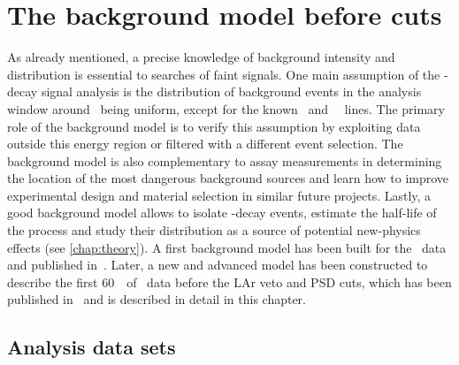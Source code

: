 
\chapter{The background model before cuts}\label{chap:bkg:raw:ph2}

As already mentioned, a precise knowledge of background intensity and distribution is
essential to searches of faint signals. One main assumption of the \onbb-decay signal
analysis is the distribution of background events in the analysis window around \qbb\
being uniform, except for the known \Tl\ and \Bil\ \g\ lines. The primary role of the
background model is to verify this assumption by exploiting data outside this energy
region or filtered with a different event selection. The background model is also
complementary to assay measurements in determining the location of the most dangerous
background sources and learn how to improve experimental design and material selection in
similar future projects. Lastly, a good background model allows to isolate \nnbb-decay
events, estimate the half-life of the process and study their distribution as a source of
potential new-physics effects (see \cref{chap:theory}).
\newpar
A first background model has been built for the \phaseone\ data and published
in~\cite{Agostini2013a}. Later, a new and advanced model has been constructed to describe
the first 60~\kgyr\ of \phasetwo\ data before the LAr veto and PSD cuts, which has been
published in~\cite{Agostini2019b} and is described in detail in this chapter.

\section{Analysis data sets}%
\label{sec:bkg:raw:data}

\begin{table}[b]
  \small
  \centering
  \caption{%
    Properties of the data sets considered in this analysis. Further
    details about the \gerda\ detectors can be found in past
    publications~\cite{Agostini2013a, Agostini2018a}.
  }\label{tab:bkg:raw:ph2:datasets}
  
\end{table}%

